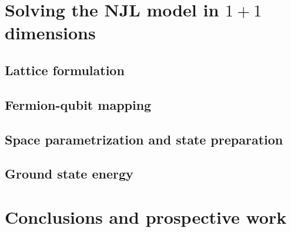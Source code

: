 \documentclass[9pt, handout, aspectratio=169]{beamer}	%
\begin{document}
\section{Solving the NJL model in $1+1$ dimensions}




\subsection{Lattice formulation}


\subsection{Fermion-qubit mapping}


\subsection{Space parametrization and state preparation}


\subsection{Ground state energy}



\section{Conclusions and prospective work}


\end{document}
